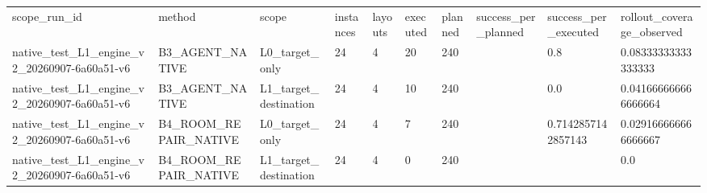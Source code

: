 \begin{tabular}{llllllllll}
scope\_run\_id & method & scope & instances & layouts & executed & planned & success\_per\_planned & success\_per\_executed & rollout\_coverage\_observed \\
native\_test\_L1\_engine\_v2\_20260907-6a60a51-v6 & B3\_AGENT\_NATIVE & L0\_target\_only & 24 & 4 & 20 & 240 &  & 0.8 & 0.08333333333333333 \\
native\_test\_L1\_engine\_v2\_20260907-6a60a51-v6 & B3\_AGENT\_NATIVE & L1\_target\_destination & 24 & 4 & 10 & 240 &  & 0.0 & 0.041666666666666664 \\
native\_test\_L1\_engine\_v2\_20260907-6a60a51-v6 & B4\_ROOM\_REPAIR\_NATIVE & L0\_target\_only & 24 & 4 & 7 & 240 &  & 0.7142857142857143 & 0.029166666666666667 \\
native\_test\_L1\_engine\_v2\_20260907-6a60a51-v6 & B4\_ROOM\_REPAIR\_NATIVE & L1\_target\_destination & 24 & 4 & 0 & 240 &  &  & 0.0 \\
\end{tabular}
